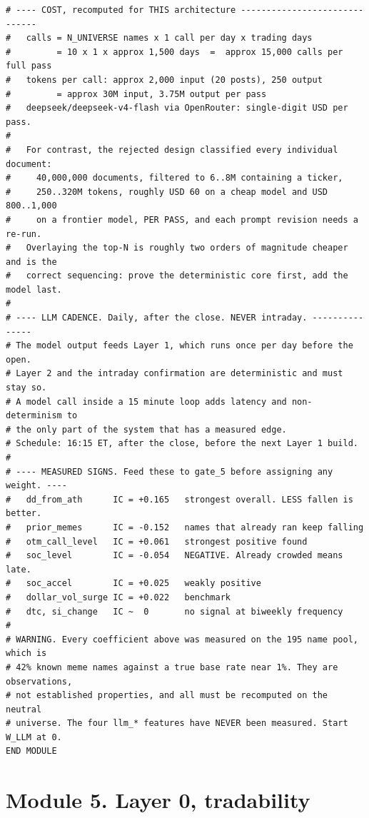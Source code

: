 \documentclass[10pt]{article}
\begin{document}
\begin{lstlisting}
# ---- COST, recomputed for THIS architecture ------------------------------
#   calls = N_UNIVERSE names x 1 call per day x trading days
#         = 10 x 1 x approx 1,500 days  =  approx 15,000 calls per full pass
#   tokens per call: approx 2,000 input (20 posts), 250 output
#         = approx 30M input, 3.75M output per pass
#   deepseek/deepseek-v4-flash via OpenRouter: single-digit USD per pass.
#
#   For contrast, the rejected design classified every individual document:
#     40,000,000 documents, filtered to 6..8M containing a ticker,
#     250..320M tokens, roughly USD 60 on a cheap model and USD 800..1,000
#     on a frontier model, PER PASS, and each prompt revision needs a re-run.
#   Overlaying the top-N is roughly two orders of magnitude cheaper and is the
#   correct sequencing: prove the deterministic core first, add the model last.
#
# ---- LLM CADENCE. Daily, after the close. NEVER intraday. ---------------
# The model output feeds Layer 1, which runs once per day before the open.
# Layer 2 and the intraday confirmation are deterministic and must stay so.
# A model call inside a 15 minute loop adds latency and non-determinism to
# the only part of the system that has a measured edge.
# Schedule: 16:15 ET, after the close, before the next Layer 1 build.
#
# ---- MEASURED SIGNS. Feed these to gate_5 before assigning any weight. ----
#   dd_from_ath      IC = +0.165   strongest overall. LESS fallen is better.
#   prior_memes      IC = -0.152   names that already ran keep falling
#   otm_call_level   IC = +0.061   strongest positive found
#   soc_level        IC = -0.054   NEGATIVE. Already crowded means late.
#   soc_accel        IC = +0.025   weakly positive
#   dollar_vol_surge IC = +0.022   benchmark
#   dtc, si_change   IC ~  0       no signal at biweekly frequency
#
# WARNING. Every coefficient above was measured on the 195 name pool, which is
# 42% known meme names against a true base rate near 1%. They are observations,
# not established properties, and all must be recomputed on the neutral
# universe. The four llm_* features have NEVER been measured. Start W_LLM at 0.
END MODULE
\end{lstlisting}

\section{Module 5. Layer 0, tradability}
\end{document}
